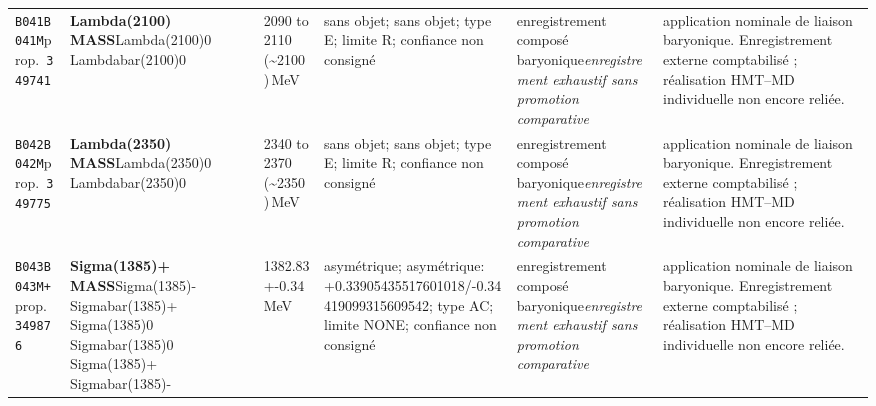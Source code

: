 \begin{landscape}
\begin{longtable}{L{1.85cm}L{4.45cm}L{2.35cm}L{4.05cm}L{3.35cm}L{7.15cm}}
\texttt{B041}\newline \texttt{B041M}\newline prop.\ \texttt{349741} & \textbf{Lambda(2100) MASS}\newline Lambda(2100)0 \textbar{}\allowbreak{} Lambdabar(2100)0 & 2090 to 2110 (\textasciitilde{}2100)\,MeV & sans objet; sans objet; type E; limite R; confiance non consigné & enregistrement composé baryonique\newline \emph{enregistrement exhaustif sans promotion comparative} & application nominale de liaison baryonique. Enregistrement externe comptabilisé ; réalisation HMT--MD individuelle non encore reliée. \\
\texttt{B042}\newline \texttt{B042M}\newline prop.\ \texttt{349775} & \textbf{Lambda(2350) MASS}\newline Lambda(2350)0 \textbar{}\allowbreak{} Lambdabar(2350)0 & 2340 to 2370 (\textasciitilde{}2350)\,MeV & sans objet; sans objet; type E; limite R; confiance non consigné & enregistrement composé baryonique\newline \emph{enregistrement exhaustif sans promotion comparative} & application nominale de liaison baryonique. Enregistrement externe comptabilisé ; réalisation HMT--MD individuelle non encore reliée. \\
\texttt{B043}\newline \texttt{B043M+}\newline prop.\ \texttt{349876} & \textbf{Sigma(1385)+ MASS}\newline Sigma(1385)- \textbar{}\allowbreak{} Sigmabar(1385)+ \textbar{}\allowbreak{} Sigma(1385)0 \textbar{}\allowbreak{} Sigmabar(1385)0 \textbar{}\allowbreak{} Sigma(1385)+ \textbar{}\allowbreak{} Sigmabar(1385)- & 1382.83+-0.34\,MeV & asymétrique; asymétrique: +0.33905435517601018/-0.34419099315609542; type AC; limite NONE; confiance non consigné & enregistrement composé baryonique\newline \emph{enregistrement exhaustif sans promotion comparative} & application nominale de liaison baryonique. Enregistrement externe comptabilisé ; réalisation HMT--MD individuelle non encore reliée. \\

\end{longtable}
\end{landscape}
